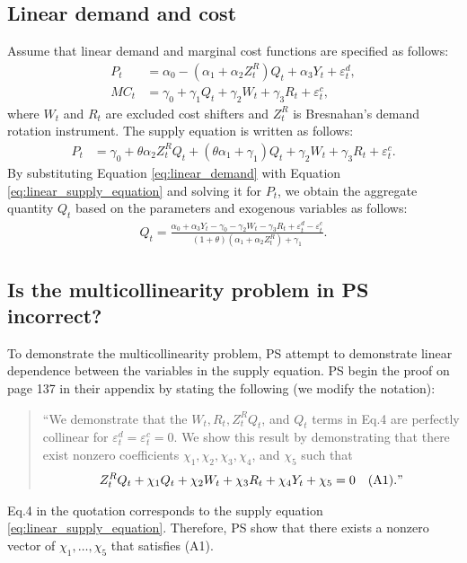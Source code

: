 \documentclass[11pt, a4paper]{article}
\begin{document}
\subsection{Linear demand and cost}
Assume that linear demand and marginal cost functions are specified as follows:
\begin{align}
    P_t &= \alpha_0 - (\alpha_1 + \alpha_2Z^{R}_{t})Q_{t} + \alpha_3 Y_t + \varepsilon^{d}_{t},\label{eq:linear_demand}\\
    MC_t &= \gamma_0  + \gamma_1 Q_{t} + \gamma_2 W_{t} + \gamma_3 R_{t} + \varepsilon^{c}_{t},\label{eq:linear_marginal_cost}
\end{align}
where $W_{t}$ and $R_{t}$ are excluded cost shifters and $Z^{R}_{t}$ is Bresnahan's demand rotation instrument. 
The supply equation is written as follows:
\begin{align}
    P_t 
    &= \gamma_0 + \theta \alpha_2 Z^{R}_tQ_{t} + (\theta\alpha_1 + \gamma_1) Q_{t} + \gamma_2 W_t + \gamma_3 R_{t} +\varepsilon^c_t.\label{eq:linear_supply_equation}
\end{align}
By substituting Equation \eqref{eq:linear_demand} with Equation \eqref{eq:linear_supply_equation} and solving it for $P_t$, we obtain the aggregate quantity $Q_{t}$ based on the parameters and exogenous variables as follows:
\begin{align}
    Q_{t} =  \frac{\alpha_0 + \alpha_3 Y_t - \gamma_0 - \gamma_2 W_{t} - \gamma_3 R_{t} + \varepsilon^{d}_{t} - \varepsilon^{c}_{t}}{(1 + \theta) (\alpha_1 + \alpha_2 Z^{R}_{t}) + \gamma_1}.\label{eq:quantity_linear}
\end{align}

\subsection{Is the multicollinearity problem in PS incorrect?}
To demonstrate the multicollinearity problem, PS attempt to demonstrate linear dependence between the variables in the supply equation. 
PS begin the proof on page 137 in their appendix by stating the following (we modify the notation):
\begin{quote}
    ``We demonstrate that the $W_{t}, R_{t}, Z^{R}_{t}Q_{t}$, and $Q_{t}$ terms in Eq.4 are perfectly collinear for $\varepsilon_{t}^{d} = \varepsilon_{t}^{c} = 0$. We show this result by demonstrating that there exist nonzero coefficients $\chi_1,\chi_2,\chi_3,\chi_4$, and $\chi_5$ such that 
   \begin{align*}
    Z^{R}_{t} Q_{t} + \chi_1 Q_{t} + \chi_2 W_{t} + \chi_3 R_{t} + \chi_4 Y_{t} + \chi_5 = 0 \quad (\text{A1})."
    \end{align*}
\end{quote}
Eq.4 in the quotation corresponds to the supply equation \eqref{eq:linear_supply_equation}.
Therefore, PS show that there exists a nonzero vector of $\chi_1, \ldots, \chi_5$ that satisfies (A1).
\end{document}
